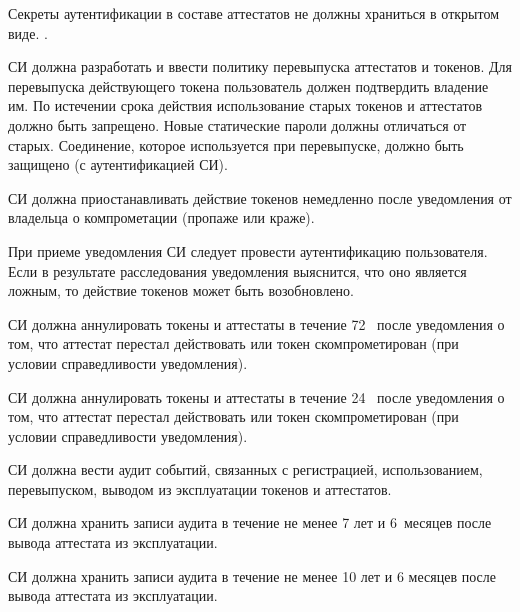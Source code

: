 Секреты аутентификации в составе аттестатов не должны храниться в открытом 
виде. .


СИ должна разработать и ввести политику перевыпуска аттестатов и токенов.
Для перевыпуска действующего токена пользователь должен 
подтвердить владение им. По истечении срока действия
использование старых токенов и аттестатов должно быть запрещено. 
Новые статические пароли должны отличаться от старых. 
Соединение, которое используется при перевыпуске, должно быть защищено 
(с аутентификацией СИ). 




СИ должна приостанавливать действие токенов немедленно после 
уведомления от владельца о компрометации (пропаже или краже).

\begin{note*}
При приеме уведомления СИ следует провести аутентификацию пользователя.
%
Если в результате расследования уведомления выяснится, что оно является 
ложным, то действие токенов может быть возобновлено.
\end{note*}


СИ должна аннулировать токены и аттестаты в течение 72~ 
после уведомления о том, что аттестат перестал действовать 
или токен скомпрометирован (при условии справедливости уведомления).

СИ должна аннулировать токены и аттестаты в течение 24~ 
после уведомления о том, что аттестат перестал действовать 
или токен скомпрометирован (при условии справедливости уведомления). 

СИ должна вести аудит событий, связанных с регистрацией, использованием, 
перевыпуском, выводом из эксплуатации токенов и аттестатов.  


СИ должна хранить записи аудита в течение не менее 7 лет и 6~месяцев после 
вывода аттестата из эксплуатации.  

СИ должна хранить записи аудита в течение не менее 10 лет и 6 месяцев 
после вывода аттестата из эксплуатации.  
